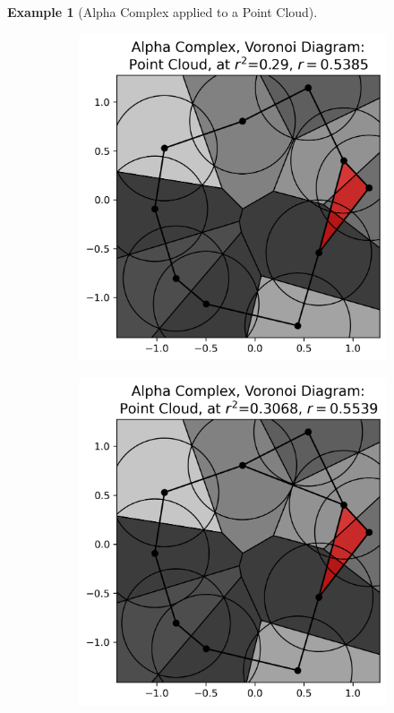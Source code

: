 \documentclass[ma]{uncgdissertationexp}
\theoremstyle{plain}
\theoremstyle{definition}
\newtheorem{example}[theorem]{Example}
\theoremstyle{remark}
\begin{document}
\begin{example}[Alpha Complex applied to a Point Cloud]
\begin{figure}[H]
\begin{subfigure}[b]{0.26\textwidth}
    \end{subfigure}
    \begin{subfigure}[b]{0.26\textwidth}
        \includegraphics[width=\textwidth]{point_cloud_plot_alpha_3.png}
    \end{subfigure}
    \begin{subfigure}[b]{0.26\textwidth}
        \includegraphics[width=\textwidth]{point_cloud_plot_alpha_4.png}

\end{subfigure}
\end{figure}
\end{example}
\end{document}
